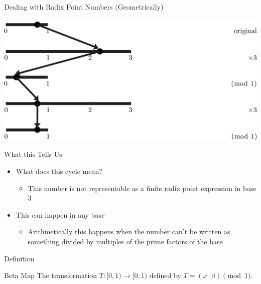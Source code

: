 \documentclass{beamer}
\begin{document}
\begin{frame}{Dealing with Radix Point Numbers (Geometrically)}
  \begin{example}
    \includegraphics[width=\textwidth,height=0.75\textheight]{images/Ternary/5}
  \end{example}
\end{frame}

\begin{frame}{What this Tells Us}
  \begin{itemize}
    \item What does this cycle mean?
    \begin{itemize}
      \item This number is not representable as a finite radix point expression in base 3
    \end{itemize}
    \item This can happen in any base
    \begin{itemize}
      \item Arithmetically this happens when the number can't be written as something divided by multiples of the prime factors of the base
    \end{itemize}
  \end{itemize}
\end{frame}

\begin{frame}{Definition}
  \begin{block}{Beta Map}
    The transformation $T:[0,1)\to[0,1)$ defined by $T=(x\cdot\beta)\pmod{1}$.
  \end{block}
\end{frame}
\end{document}
